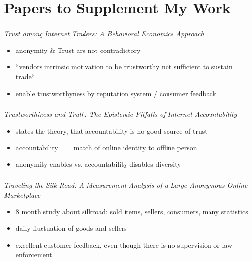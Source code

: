 \section{Papers to Supplement My Work}

\begin{frame}
    \frametitle{\insertsection}
    \emph{Trust among Internet Traders: A Behavioral Economics Approach}~\cite{internetTrust2004}
    \vspace{1em}
    \begin{itemize}
        \itemsep\setlength{1em}
        \item anonymity \& Trust are not contradictory
        \item ``vendors intrinsic motivation to be trustworthy not sufficient to sustain trade``
        \item enable trustworthyness by reputation system / consumer feedback 
    \end{itemize}
\end{frame}


\begin{frame}
    \frametitle{\insertsection}
    \emph{Trustworthiness and Truth: The Epistemic Pitfalls of Internet Accountability}~\cite{accountability2014}
    \vspace{1em}
    \begin{itemize}
        \itemsep\setlength{1em}
        \item states the theory, that accountability is no good source of trust
        \item accountability == match of online identity to offline person
        \item anonymity enables vs. accountability disables diversity
    \end{itemize}
\end{frame}

\begin{frame}
    \frametitle{\insertsection}
    \emph{Traveling the Silk Road: A Measurement Analysis of a Large Anonymous Online Marketplace}~\cite{silkroad2013}
    \vspace{1em}
    \begin{itemize}
        \itemsep\setlength{1em}
        \item 8 month study about silkroad: sold items, sellers, consumers, many statistics
        \item daily fluctuation of goods and sellers
        \item excellent customer feedback, even though there is no supervision or law enforcement
    \end{itemize}
\end{frame}

